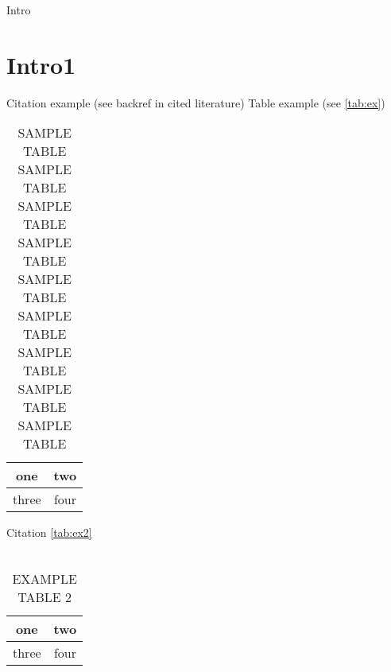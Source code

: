 
Intro

\section{Intro1} \label{sec:intro1}
	Citation example (see backref in cited literature) \cite{Love-2010-LKD}
	Table example (see \autoref{tab:ex})
	\begin{table}[ht]
		\caption[EXAMPLE TABLE 1]{SAMPLE TABLE SAMPLE TABLE SAMPLE TABLE SAMPLE TABLE SAMPLE TABLE SAMPLE TABLE SAMPLE TABLE SAMPLE TABLE SAMPLE TABLE}\label{tab:ex}
		\centering
		\begin{tabular}{|c|c|}\hline
			one		& two\\\hline
			three	& four\\\hline
		\end{tabular}
	\end{table}
	
	\lipsum
		Citation	\autoref{tab:ex2} \\ \\
	\lipsum
	
	\begin{table}[ht]
		\caption{EXAMPLE TABLE 2}\label{tab:ex2}
		\centering
		\begin{tabular}{|c|c|}\hline
			one		& two\\\hline
			three	& four\\\hline
		\end{tabular}
	\end{table}

	\lipsum